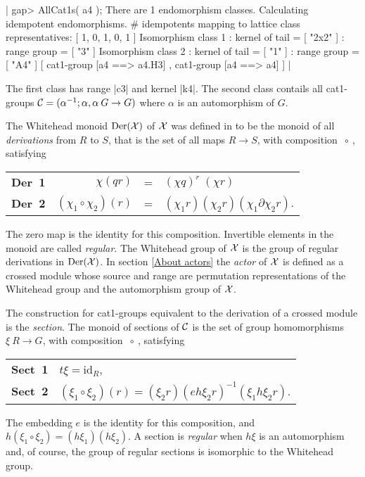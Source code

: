 |    gap> AllCat1s( a4 );
    There are 1 endomorphism classes.
    Calculating idempotent endomorphisms.
    # idempotents mapping to lattice class representatives:
    [ 1, 0, 1, 0, 1 ]
    Isomorphism class 1
    : kernel of tail = [ "2x2" ]
    :    range group = [ "3" ]
    Isomorphism class 2
    : kernel of tail = [ "1" ]
    :    range group = [ "A4" ]
    [ cat1-group [a4 ==> a4.H3] , cat1-group [a4 ==> a4] ]  |

The first class has range |c3| and kernel |k4|.
The second class contails all cat1-groups 
${\cal C} = (\alpha^{-1}; \alpha, \alpha \: G \to G)$
where  $\alpha$  is an automorphism of $G$.

\newpage



%

The Whitehead monoid  $\rm{Der}({\cal X})$  of  ${\cal X}$ 
was defined in \cite{W2} 
to be the monoid of all {\it derivations}
from $ R $ to $S$, that is the set of all maps  $R \to S$,
with composition  $\ \circ \ $, satisfying
\begin{center}
\begin{tabular}{c r c l }
\textbf{Der\ 1\:}  &  $\chi(qr)$              &  = 
           & $(\chi q)^{r} \; (\chi r)$  \\
\textbf{Der\ 2\:}  &  $(\chi_1 \circ \chi_2)(r)$  &  =
           & $(\chi_1 r)(\chi_2 r)(\chi_1 \partial \chi_2 r)$. 
\end{tabular}
\end{center}

\noindent
The zero map is the identity for this composition.
Invertible elements in the monoid are called {\em regular}.
The Whitehead group of ${\cal X}$ 
is the group of regular derivations in $\rm{Der}({\cal X} )$. 
In section \ref{About actors} the {\em actor} of ${\cal X}$ 
is defined as a crossed module whose source and range are permutation 
representations of the Whitehead group and the automorphism group of 
${\cal X}$.

The construction for cat1-groups equivalent to the derivation of a
crossed module is the {\em section}. 
The monoid of sections of  ${\cal C}$  is the set of group homomorphisms
$\xi \: R \to G$, with composition  $\ \circ \ $,  satisfying\:
\begin{center}
\begin{tabular}{l l}
\textbf{Sect\ 1\:}  &  $t \xi = \mathrm{id}_R$,               \\
\textbf{Sect\ 2\:}  &  $(\xi_1 \circ \xi_2)(r) =
                       (\xi_{2}r)(e h \xi_{2}r)^{-1}(\xi_{1} h \xi_{2}r)$.
\end{tabular}
\end{center}
The embedding  $e$  is the identity for this composition,
and  $h(\xi_1 \circ \xi_2) = (h \xi_1)(h \xi_2)$.
A section is  {\em regular}  when  $h \xi$  is an automorphism and,
of course, the group of regular sections is isomorphic to the
Whitehead group.

